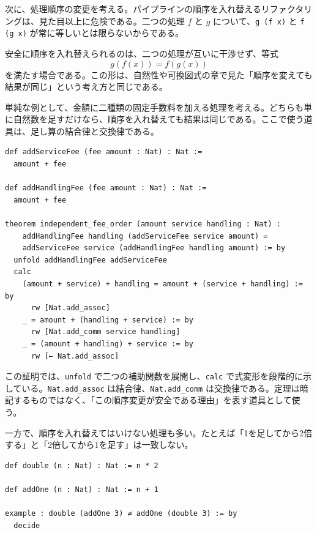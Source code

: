 次に、処理順序の変更を考える。パイプラインの順序を入れ替えるリファクタリングは、見た目以上に危険である。二つの処理 \(f\) と \(g\) について、\texttt{g (f x)} と \texttt{f (g x)} が常に等しいとは限らないからである。

安全に順序を入れ替えられるのは、二つの処理が互いに干渉せず、等式
\[
  g(f(x)) = f(g(x))
\]
を満たす場合である。この形は、自然性や可換図式の章で見た「順序を変えても結果が同じ」という考え方と同じである。


単純な例として、金額に二種類の固定手数料を加える処理を考える。どちらも単に自然数を足すだけなら、順序を入れ替えても結果は同じである。ここで使う道具は、足し算の結合律と交換律である。

\begin{listing}[htbp]
\begin{verbatim}
def addServiceFee (fee amount : Nat) : Nat :=
  amount + fee

def addHandlingFee (fee amount : Nat) : Nat :=
  amount + fee

theorem independent_fee_order (amount service handling : Nat) :
    addHandlingFee handling (addServiceFee service amount) =
    addServiceFee service (addHandlingFee handling amount) := by
  unfold addHandlingFee addServiceFee
  calc
    (amount + service) + handling = amount + (service + handling) := by
      rw [Nat.add_assoc]
    _ = amount + (handling + service) := by
      rw [Nat.add_comm service handling]
    _ = (amount + handling) + service := by
      rw [← Nat.add_assoc]
\end{verbatim}
\caption{独立した二つの手数料処理は順序を入れ替えられる}
\label{lst:ch28-order-preserves}
\end{listing}

\begin{leanbox}
この証明では、\texttt{unfold} で二つの補助関数を展開し、\texttt{calc} で式変形を段階的に示している。\texttt{Nat.add\_assoc} は結合律、\texttt{Nat.add\_comm} は交換律である。定理は暗記するものではなく、「この順序変更が安全である理由」を表す道具として使う。
\end{leanbox}

一方で、順序を入れ替えてはいけない処理も多い。たとえば「1を足してから2倍する」と「2倍してから1を足す」は一致しない。

\begin{listing}[htbp]
\begin{verbatim}
def double (n : Nat) : Nat := n * 2

def addOne (n : Nat) : Nat := n + 1

example : double (addOne 3) ≠ addOne (double 3) := by
  decide
\end{verbatim}
\caption{順序を変えると意味が変わる小例}
\label{lst:ch28-order-not-always-safe}
\end{listing}

